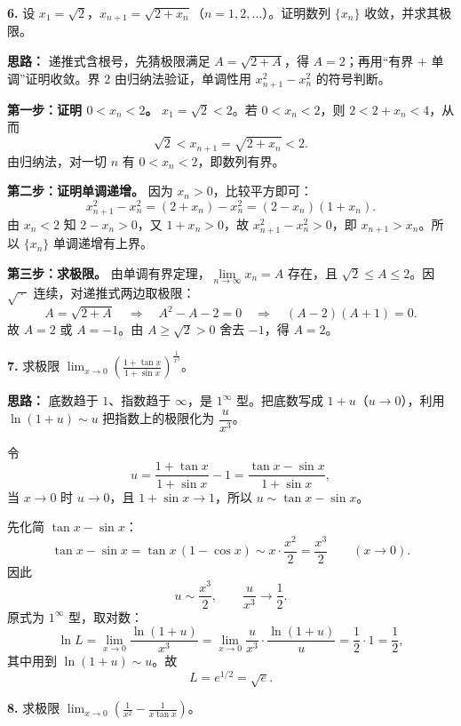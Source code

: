 \textbf{6.} 设 $x_1=\sqrt2$，$x_{n+1}=\sqrt{2+x_n}$（$n=1,2,\dots$）。证明数列 $\{x_n\}$ 收敛，并求其极限。

\ifshowsolutions%
\textbf{思路：} 递推式含根号，先猜极限满足 $A=\sqrt{2+A}$，得 $A=2$；再用“有界 $+$ 单调”证明收敛。界 $2$ 由归纳法验证，单调性用 $x_{n+1}^2-x_n^2$ 的符号判断。

\textbf{第一步：证明 $0<x_n<2$。} $x_1=\sqrt2<2$。若 $0<x_n<2$，则 $2<2+x_n<4$，从而
\[
\sqrt2<x_{n+1}=\sqrt{2+x_n}<2 .
\]
由归纳法，对一切 $n$ 有 $0<x_n<2$，即数列有界。

\textbf{第二步：证明单调递增。} 因为 $x_n>0$，比较平方即可：
\[
x_{n+1}^2-x_n^2=(2+x_n)-x_n^2=(2-x_n)(1+x_n).
\]
由 $x_n<2$ 知 $2-x_n>0$，又 $1+x_n>0$，故 $x_{n+1}^2-x_n^2>0$，即 $x_{n+1}>x_n$。所以 $\{x_n\}$ 单调递增有上界。

\textbf{第三步：求极限。} 由单调有界定理，$\lim\limits_{n\to\infty}x_n=A$ 存在，且 $\sqrt2\le A\le 2$。因 $\sqrt{\ \cdot\ }$ 连续，对递推式两边取极限：
\[
A=\sqrt{2+A}\quad\Longrightarrow\quad A^2-A-2=0\quad\Longrightarrow\quad (A-2)(A+1)=0 .
\]
故 $A=2$ 或 $A=-1$。由 $A\ge\sqrt2>0$ 舍去 $-1$，得 $A=2$。


\else \answerarea[12] \fi%

\textbf{7.} 求极限 $\displaystyle\lim_{x\to0}\left(\frac{1+\tan x}{1+\sin x}\right)^{\frac{1}{x^3}}$。

\ifshowsolutions%
\textbf{思路：} 底数趋于 $1$、指数趋于 $\infty$，是 $1^\infty$ 型。把底数写成 $1+u$（$u\to0$），利用 $\ln(1+u)\sim u$ 把指数上的极限化为 $\dfrac{u}{x^3}$。

令
\[
u=\frac{1+\tan x}{1+\sin x}-1=\frac{\tan x-\sin x}{1+\sin x},
\]
当 $x\to0$ 时 $u\to0$，且 $1+\sin x\to1$，所以 $u\sim \tan x-\sin x$。

先化简 $\tan x-\sin x$：
\[
\tan x-\sin x=\tan x\,(1-\cos x)\sim x\cdot\frac{x^2}{2}=\frac{x^3}{2}\qquad(x\to0).
\]
因此
\[
u\sim\frac{x^3}{2},\qquad \frac{u}{x^3}\to\frac12 .
\]
原式为 $1^\infty$ 型，取对数：
\[
\ln L=\lim_{x\to0}\frac{\ln(1+u)}{x^3}
=\lim_{x\to0}\frac{u}{x^3}\cdot\frac{\ln(1+u)}{u}
=\frac12\cdot 1=\frac12,
\]
其中用到 $\ln(1+u)\sim u$。故
\[
L=e^{1/2}=\sqrt e .
\]


\else \answerarea[10] \fi%

\textbf{8.} 求极限 $\displaystyle\lim_{x\to0}\left(\frac{1}{x^2}-\frac{1}{x\tan x}\right)$。

